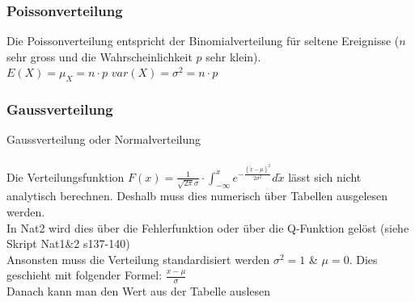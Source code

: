 \subsubsection{Poissonverteilung}
Die Poissonverteilung entspricht der Binomialverteilung für seltene Ereignisse ($n$ sehr gross und die Wahrscheinlichkeit $p$ sehr klein).\\
 \qquad $E(X)=\mu_X = n \cdot p$ \qquad $var(X)=\sigma^2 = n \cdot p$

\subsubsection{Gaussverteilung}
Gaussverteilung oder Normalverteilung\\
\\
Die Verteilungsfunktion $F(x)=\frac{1}{\sqrt{2 \pi} \sigma} \cdot \int_{-\infty}^{x} e^{-\frac{(\tilde{x}-\mu)^{2}}{2 \sigma^{2}}} d \tilde{x}$ lässt sich nicht analytisch berechnen. Deshalb muss dies numerisch über Tabellen ausgelesen werden.\\
In Nat2 wird dies über die Fehlerfunktion oder über die Q-Funktion gelöst (siehe Skript Nat1\&2 s137-140)\\
Ansonsten muss die Verteilung standardisiert werden $\sigma^2 = 1$ \& $\mu = 0$. Dies geschieht mit folgender Formel: $\frac{x-\mu}{\sigma}$\\
Danach kann man den Wert aus der Tabelle auslesen\\












